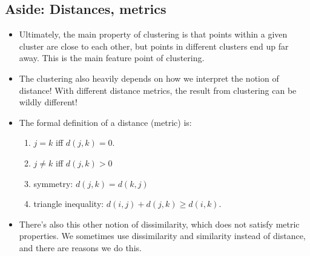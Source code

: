 \subsection{Aside: Distances, metrics}
\begin{itemize}
	\item Ultimately, the main property of clustering is that points within a given cluster are close to each
		other, but points in different clusters end up far away. This is the main feature point of
		clustering. 
	\item The clustering also heavily depends on how we interpret the notion of distance! With different
		distance metrics, the result from clustering can be wildly different! 
	\item The formal definition of a distance (metric) is:
		\begin{enumerate}[label=\arabic*.]
			\item \( j = k \) iff \( d(j, k) = 0 \). 
			\item \( j \neq k \) iff \( d(j, k) > 0 \)
			\item symmetry: \( d(j, k) = d(k, j) \)
			\item triangle inequality: \( d(i, j) + d(j, k) \geq d(i, k) \). 
		\end{enumerate}
	\item There's also this other notion of dissimilarity, which does not satisfy metric properties. We
		sometimes use dissimilarity and similarity instead of distance, and there are reasons we do this. 
\end{itemize}

